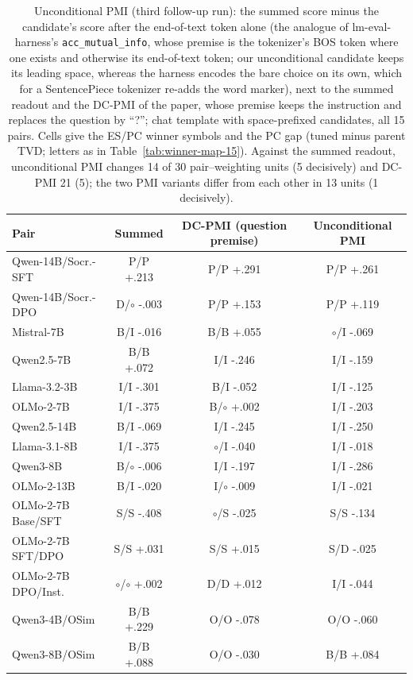 \begin{table}[t]
\centering\scriptsize
\setlength{\tabcolsep}{3pt}
\begin{tabular}{@{}lccc@{}}
\toprule
Pair & Summed & DC-PMI (question premise) & Unconditional PMI \\
\midrule
Qwen-14B/Socr.-SFT & P/P +.213 & P/P +.291 & P/P +.261 \\
Qwen-14B/Socr.-DPO & D/$\circ$ -.003 & P/P +.153 & P/P +.119 \\
\addlinespace[2pt]
Mistral-7B & B/I -.016 & B/B +.055 & $\circ$/I -.069 \\
Qwen2.5-7B & B/B +.072 & I/I -.246 & I/I -.159 \\
Llama-3.2-3B & I/I -.301 & B/I -.052 & I/I -.125 \\
OLMo-2-7B & I/I -.375 & B/$\circ$ +.002 & I/I -.203 \\
\addlinespace[2pt]
Qwen2.5-14B & B/I -.069 & I/I -.245 & I/I -.250 \\
Llama-3.1-8B & I/I -.375 & $\circ$/I -.040 & I/I -.018 \\
Qwen3-8B & B/$\circ$ -.006 & I/I -.197 & I/I -.286 \\
OLMo-2-13B & B/I -.020 & I/$\circ$ -.009 & I/I -.021 \\
\addlinespace[2pt]
OLMo-2-7B Base/SFT & S/S -.408 & $\circ$/S -.025 & S/S -.134 \\
OLMo-2-7B SFT/DPO & S/S +.031 & S/S +.015 & S/D -.025 \\
OLMo-2-7B DPO/Inst. & $\circ$/$\circ$ +.002 & D/D +.012 & I/I -.044 \\
\addlinespace[2pt]
Qwen3-4B/OSim & B/B +.229 & O/O -.078 & O/O -.060 \\
Qwen3-8B/OSim & B/B +.088 & O/O -.030 & B/B +.084 \\
\bottomrule
\end{tabular}
\caption{Unconditional PMI (third follow-up run): the summed score minus the candidate's score after the end-of-text token alone (the analogue of lm-eval-harness's \texttt{acc\_mutual\_info}, whose premise is the tokenizer's BOS token where one exists and otherwise its end-of-text token; our unconditional candidate keeps its leading space, whereas the harness encodes the bare choice on its own, which for a SentencePiece tokenizer re-adds the word marker), next to the summed readout and the DC-PMI of the paper, whose premise keeps the instruction and replaces the question by ``?''; chat template with space-prefixed candidates, all 15 pairs. Cells give the ES/PC winner symbols and the PC gap (tuned minus parent TVD; letters as in Table~\ref{tab:winner-map-15}). Against the summed readout, unconditional PMI changes 14 of 30 pair--weighting units (5 decisively) and DC-PMI 21 (5); the two PMI variants differ from each other in 13 units (1 decisively).}
\label{tab:dc-pmi-uncond}
\end{table}
